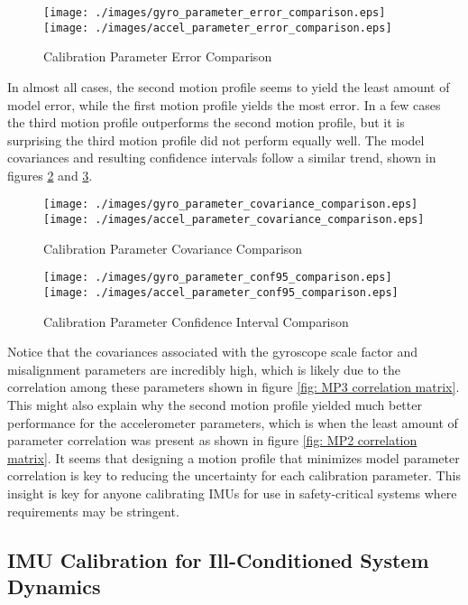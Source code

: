 \begin{figure}[!h] 
	\centering
	\texttt{[image: ./images/gyro\_parameter\_error\_comparison.eps]} \hfill
	\texttt{[image: ./images/accel\_parameter\_error\_comparison.eps]}
	\caption{Calibration Parameter Error Comparison}
	\label{fig: parameter error comparsion}
\end{figure}
\FloatBarrier

In almost all cases, the second motion profile seems to yield the least amount of model error, while the first motion profile yields the most error. In a few cases the third motion profile outperforms the second motion profile, but it is surprising the third motion profile did not perform equally well. The model covariances and resulting confidence intervals follow a similar trend, shown in figures \ref{fig: parameter covariance comparsion} and \ref{fig: parameter conf95 comparsion}. 

\begin{figure}[!h] 
	\centering
	\texttt{[image: ./images/gyro\_parameter\_covariance\_comparison.eps]} \hfill
	\texttt{[image: ./images/accel\_parameter\_covariance\_comparison.eps]}
	\caption{Calibration Parameter Covariance Comparison}
	\label{fig: parameter covariance comparsion}
\end{figure}
\FloatBarrier

\begin{figure}[!h] 
	\centering
	\texttt{[image: ./images/gyro\_parameter\_conf95\_comparison.eps]} \hfill
	\texttt{[image: ./images/accel\_parameter\_conf95\_comparison.eps]}
	\caption{Calibration Parameter Confidence Interval Comparison}
	\label{fig: parameter conf95 comparsion}
\end{figure}
\FloatBarrier

Notice that the covariances associated with the gyroscope scale factor and misalignment parameters are incredibly high, which is likely due to the correlation among these parameters shown in figure \ref{fig: MP3 correlation matrix}. This might also explain why the second motion profile yielded much better performance for the accelerometer parameters, which is when the least amount of parameter correlation was present as shown in figure \ref{fig: MP2 correlation matrix}. It seems that designing a motion profile that minimizes model parameter correlation is key to reducing the uncertainty for each calibration parameter. This insight is key for anyone calibrating IMUs for use in safety-critical systems where requirements may be stringent.

\subsection{IMU Calibration for Ill-Conditioned System Dynamics}





